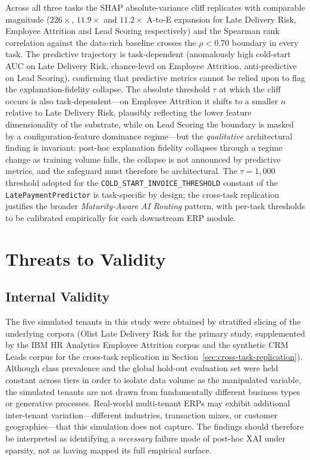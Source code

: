 Across all three tasks the SHAP absolute-variance cliff replicates
with comparable magnitude ($226\times$, $11.9\times$ and $11.2\times$
A-to-E expansion for Late Delivery Risk, Employee Attrition and Lead Scoring
respectively) and the Spearman rank correlation against the data-rich
baseline crosses the $\rho < 0.70$ boundary in every task. The
predictive trajectory is task-dependent (anomalously high cold-start
AUC on Late Delivery Risk, chance-level on Employee Attrition,
anti-predictive on Lead Scoring), confirming that predictive metrics
cannot be relied upon to flag the explanation-fidelity collapse. The
absolute threshold $\tau$ at which the cliff occurs is also
task-dependent---on Employee Attrition it shifts to a smaller $n$
relative to Late Delivery Risk, plausibly reflecting the lower feature
dimensionality of the substrate, while on Lead Scoring the boundary
is masked by a configuration-feature dominance regime---but the
\emph{qualitative} architectural finding is invariant: post-hoc
explanation fidelity collapses through a regime change as training
volume falls, the collapse is not announced by predictive metrics,
and the safeguard must therefore be architectural. The
$\tau = 1{,}000$ threshold adopted for the
\texttt{COLD\_START\_INVOICE\_THRESHOLD} constant of the
\texttt{LatePaymentPredictor} is task-specific by design; the
cross-task replication justifies the broader
\emph{Maturity-Aware AI Routing} pattern, with per-task thresholds
to be calibrated empirically for each downstream ERP module.

\section{Threats to Validity}
\label{sec:threats}

\subsection{Internal Validity}
\label{subsec:internal-validity}

The five simulated tenants in this study were obtained by stratified slicing
of the underlying corpora (Olist Late Delivery Risk for the primary study,
supplemented by the IBM HR Analytics Employee Attrition corpus and the
synthetic CRM Leads corpus for the cross-task replication
in Section~\ref{sec:cross-task-replication}).
Although class prevalence and the global hold-out evaluation set were held
constant across tiers in order to isolate data volume as the manipulated
variable, the simulated tenants are not drawn from fundamentally different
business types or generative processes. Real-world multi-tenant ERPs may
exhibit additional inter-tenant variation---different industries, transaction
mixes, or customer geographies---that this simulation does not capture. The
findings should therefore be interpreted as identifying a \emph{necessary}
failure mode of post-hoc XAI under sparsity, not as having mapped its full
empirical surface.

